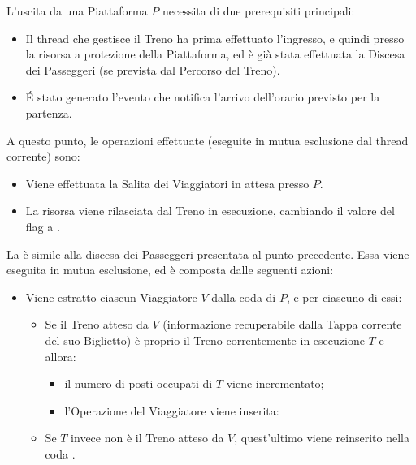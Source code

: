 \begin{description}
		L'uscita da una Piattaforma $P$ necessita di due prerequisiti principali:
		
			\begin{itemize}
				\item Il thread che gestisce il Treno ha prima effettuato l'ingresso, e quindi  presso la risorsa a protezione della Piattaforma, ed è già stata effettuata la Discesa dei Passeggeri (se prevista dal Percorso del Treno).
				\item \'E stato generato l'evento che notifica l'arrivo dell'orario previsto per la partenza.
			\end{itemize}
		
		A questo punto, le operazioni effettuate (eseguite in mutua esclusione dal thread corrente) sono:
		
			\begin{itemize}
				\item Viene effettuata la Salita dei Viaggiatori in attesa presso $P$.
				\item La risorsa viene rilasciata dal Treno in esecuzione, cambiando il valore del flag  a .
			\end{itemize}
		
		La  è simile alla discesa dei Passeggeri presentata al punto precedente. Essa viene eseguita in mutua esclusione, ed è composta dalle seguenti azioni:
		\begin{itemize}
			\item Viene estratto ciascun Viaggiatore $V$ dalla coda  di $P$, e per ciascuno di essi:
			\begin{itemize}
				\item Se il Treno atteso da $V$ (informazione recuperabile dalla Tappa corrente del suo Biglietto) è proprio il Treno correntemente in esecuzione $T$ e  allora:
					\begin{itemize}
						\item il numero di posti occupati di $T$ viene incrementato;
						\item l'Operazione  del Viaggiatore viene inserita:
					\end{itemize}
				\item Se $T$ invece non è il Treno atteso da $V$, quest'ultimo viene reinserito nella coda .
			\end {itemize}
		\end{itemize}
	\end {description}

